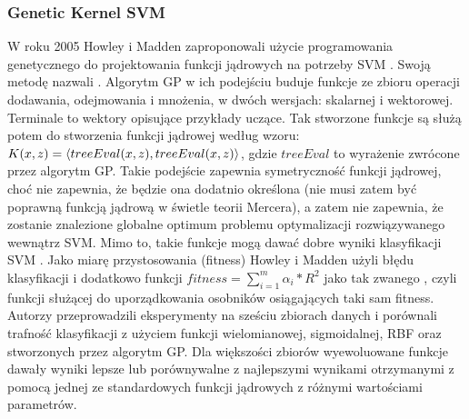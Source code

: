 \subsubsection{Genetic Kernel SVM}
W roku 2005 Howley i Madden zaproponowali użycie programowania genetycznego do projektowania funkcji jądrowych na potrzeby SVM \cite{howley_genetic_2005}. Swoją metodę nazwali . Algorytm GP w ich podejściu buduje funkcje ze zbioru operacji dodawania, odejmowania i mnożenia, w dwóch wersjach: skalarnej i wektorowej. Terminale to wektory opisujące przykłady uczące. Tak stworzone funkcje są służą potem do stworzenia funkcji jądrowej według wzoru:
$ K(x, z) = \langle treeEval(x, z), treeEval(x, z) \rangle $, gdzie $ treeEval $ to wyrażenie zwrócone przez algorytm GP. Takie podejście zapewnia symetryczność funkcji jądrowej, choć nie zapewnia, że będzie ona dodatnio określona (nie musi zatem być poprawną funkcją jądrową w świetle teorii Mercera), a zatem nie zapewnia, że zostanie znalezione globalne optimum problemu optymalizacji rozwiązywanego wewnątrz SVM. Mimo to, takie funkcje mogą dawać dobre wyniki klasyfikacji SVM \cite{Bahlmann:2002:OHR:851040.856840}. 
Jako miarę przystosowania (fitness) Howley i Madden użyli błędu klasyfikacji i dodatkowo funkcji $ fitness = \sum_{i=1}^m \alpha_i * R^2 $ jako tak zwanego , czyli funkcji służącej do uporządkowania osobników osiągających taki sam fitness.
Autorzy przeprowadzili eksperymenty na sześciu zbiorach danych i porównali trafność klasyfikacji z użyciem funkcji wielomianowej, sigmoidalnej, RBF oraz stworzonych przez algorytm GP. Dla większości zbiorów wyewoluowane funkcje dawały wyniki lepsze lub porównywalne z najlepszymi wynikami otrzymanymi z pomocą jednej ze standardowych funkcji jądrowych z różnymi wartościami parametrów.

